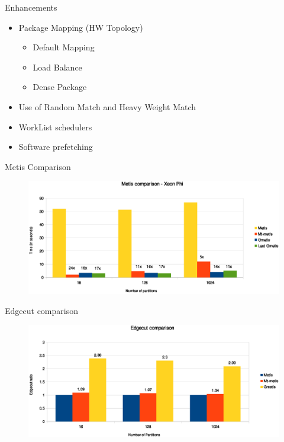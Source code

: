 \documentclass{beamer}
\begin{document}
\begin{frame}{Enhancements}
  \begin{itemize}
    \item Package Mapping (HW Topology)
    \begin{itemize}
      \item Default Mapping
      \item Load Balance
      \item Dense Package
    \end{itemize}
    \item Use of Random Match and Heavy Weight Match
    \item WorkList schedulers
    \item Software prefetching
\end{itemize}
\end{frame}

\begin{frame}{Metis Comparison}
\begin{center}
  \begin{figure}[htbp]
    \includegraphics[scale=.45]{img/comparison.eps}
  \end{figure}
\end{center}
\end{frame}

\begin{frame}{Edgecut comparison}
\begin{center}
  \begin{figure}[htbp]
    \includegraphics[scale=.45]{img/edgecut.eps}
  \end{figure}
\end{center}
\end{frame}
\end{document}
